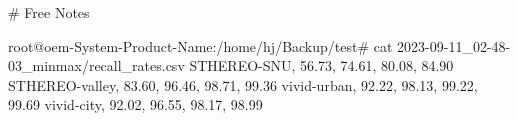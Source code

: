 # Free Notes






root@oem-System-Product-Name:/home/hj/Backup/test# cat 2023-09-11_02-48-03_minmax/recall_rates.csv 
STHEREO-SNU, 56.73, 74.61, 80.08, 84.90
STHEREO-valley, 83.60, 96.46, 98.71, 99.36
vivid-urban, 92.22, 98.13, 99.22, 99.69
vivid-city, 92.02, 96.55, 98.17, 98.99

